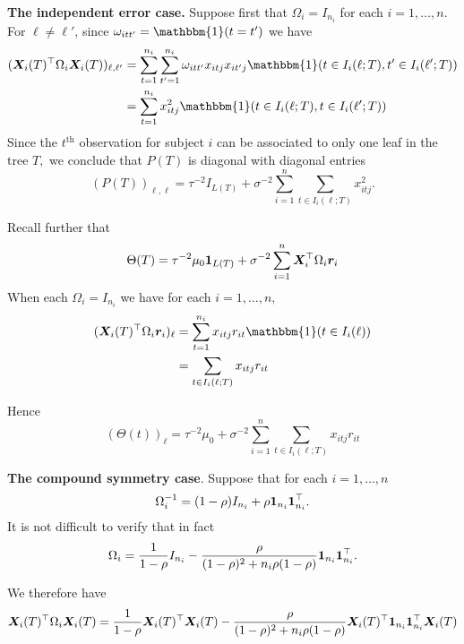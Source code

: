 \documentclass[11pt]{article}
\begin{document}
\textbf{The independent error case.} 
Suppose first that $\Omega_{i} = I_{n_{i}}$ for each $i = 1, \ldots, n.$
For $\ell \neq \ell'$, since $\omega_{itt'} = \mathbbm{1}(t = t')$ we have
\begin{align*}
(\bX_{i}(T)^{\top}\Omega_{i}\bX_{i}(T))_{\ell,\ell'} &= \sum_{t = 1}^{n_{i}}{\sum_{t' = 1}^{n_{i}}{\omega_{itt'}x_{itj}x_{it'j}\mathbbm{1}(t \in I_{i}(\ell;T), t' \in I_{i}(\ell';T))}} \\
&= \sum_{t = 1}^{n_{i}}{x_{itj}^{2}\mathbbm{1}(t \in I_{i}(\ell;T), t \in I_{i}(\ell';T))} \\
\end{align*}
Since the $t^{\text{th}}$ observation for subject $i$ can be associated to only one leaf in the tree $T,$ we conclude that $P(T)$ is diagonal with diagonal entries
$$
(P(T))_{\ell,\ell} = \tau^{-2}I_{L(T)} + \sigma^{-2}\sum_{i = 1}^{n}{\sum_{t \in I_{i}(\ell;T)}{x_{itj}^{2}}}.
$$

Recall further that
$$
\Theta(T) = \tau^{-2}\mu_{0}\boldsymbol{1}_{L(T)} + \sigma^{-2}\sum_{i = 1}^{n}{\bm{X}_{i}^{\top}\Omega_{i}\bm{r}_{i}}
$$
When each $\Omega_{i} = I_{n_{i}}$ we have for each $i = 1, \ldots, n,$
\begin{align*}
(\bX_{i}(T)^{\top}\Omega_{i}\br_{i})_{\ell} &= \sum_{t = 1}^{n_{i}}{x_{itj}r_{it}\mathbbm{1}(t \in I_{i}(\ell))} \\
&= \sum_{t \in I_{i}(\ell;T)}{x_{itj}r_{it}}
\end{align*}

Hence
$$
(\Theta(t))_{\ell} = \tau^{-2}\mu_{0} + \sigma^{-2}\sum_{i = 1}^{n}{\sum_{t \in I_{i}(\ell;T)}{x_{itj}r_{it}}}
$$

\textbf{The compound symmetry case}. Suppose that for each $i = 1, \ldots, n$ 
$$
\Omega_{i}^{-1} = (1 - \rho)I_{n_{i}} + \rho \boldsymbol{1}_{n_{i}}\boldsymbol{1}_{n_{i}}^{\top}.
$$
It is not difficult to verify that in fact
$$
\Omega_{i} = \frac{1}{1 - \rho}I_{n_{i}} - \frac{\rho}{(1 - \rho)^{2} + n_{i}\rho(1 - \rho)}\boldsymbol{1}_{n_{i}}\boldsymbol{1}_{n_{i}}^{\top}.
$$

We therefore have
$$
\bm{X}_{i}(T)^{\top}\Omega_{i}\bm{X}_{i}(T) = \frac{1}{1 - \rho}\bm{X}_{i}(T)^{\top}\bm{X}_{i}(T) - \frac{\rho}{(1 - \rho)^{2} + n_{i}\rho(1 - \rho)}\bm{X}_{i}(T)^{\top}\boldsymbol{1}_{n_{i}}\boldsymbol{1}_{n_{i}}^{\top}\bm{X}_{i}(T) 
$$

\end{document}
